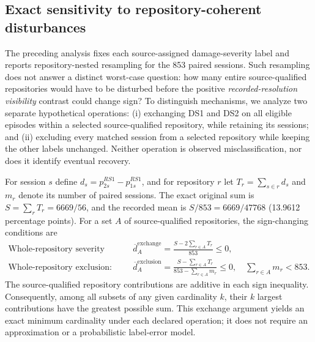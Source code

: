 
\subsection{Exact sensitivity to repository-coherent disturbances}

The preceding analysis fixes each source-assigned damage-severity label and
reports repository-nested resampling for the 853 paired sessions. Such
resampling does not answer a distinct worst-case question: how many entire
source-qualified repositories would have to be disturbed before the positive
\emph{recorded-resolution visibility} contrast could change sign?
To distinguish mechanisms, we analyze two separate hypothetical operations:
(i) exchanging DS1 and DS2 on all eligible episodes within a selected
source-qualified repository, while retaining its sessions; and
(ii) excluding every matched session from a selected repository while keeping
the other labels unchanged. Neither operation is observed misclassification,
nor does it identify eventual recovery.

For session $s$ define
$d_s=p_{2s}^{RS1}-p_{1s}^{RS1}$, and for repository $r$ let
$T_r=\sum_{s\in r}d_s$ and $m_r$ denote its number of paired sessions.
The exact original sum is $S=\sum_r T_r=6669/56$, and the recorded mean is
$S/853=6669/47768$ (13.9612 percentage points). For a set $A$ of
source-qualified repositories, the sign-changing conditions are
\begin{align*}
 \text{Whole-repository severity exchange:}\quad&
 \overline d_A^{\mathrm{exchange}} =
      \frac{S-2\sum_{r\in A}T_r}{853}\le0,
 \label{eq:repo_exchange}\\
 \text{Whole-repository exclusion:}\quad&
 \overline d_A^{\mathrm{exclusion}} =
      \frac{S-\sum_{r\in A}T_r}
           {853-\sum_{r\in A}m_r}\le0,
 \quad \sum_{r\in A}m_r<853.
 \end{align*}
The source-qualified repository contributions are additive in each sign
inequality. Consequently, among all subsets of any given cardinality $k$,
their $k$ largest contributions have the greatest possible sum. This exchange
argument yields an exact minimum cardinality under each declared operation;
it does not require an approximation or a probabilistic label-error model.

